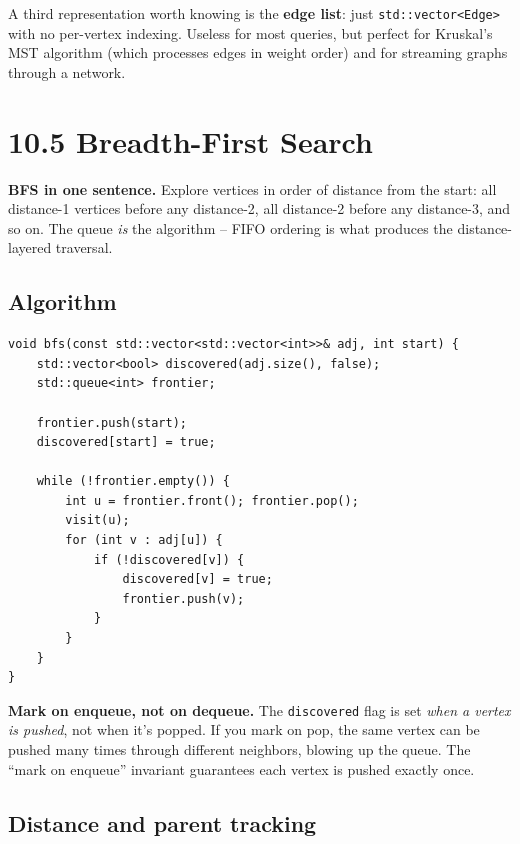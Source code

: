 \documentclass[11pt]{article}
\begin{document}
\begin{notebox}
A third representation worth knowing is the \textbf{edge list}: just \texttt{std::vector<Edge>} with no per-vertex indexing. Useless for most queries, but perfect for Kruskal's MST algorithm (which processes edges in weight order) and for streaming graphs through a network.
\end{notebox}

\section{10.5 Breadth-First Search}

\begin{ideabox}
\textbf{BFS in one sentence.} Explore vertices in order of distance from the start: all distance-1 vertices before any distance-2, all distance-2 before any distance-3, and so on. The queue \emph{is} the algorithm -- FIFO ordering is what produces the distance-layered traversal.
\end{ideabox}

\subsection*{Algorithm}

\begin{lstlisting}[basicstyle=\ttfamily\small,frame=single]
void bfs(const std::vector<std::vector<int>>& adj, int start) {
    std::vector<bool> discovered(adj.size(), false);
    std::queue<int> frontier;

    frontier.push(start);
    discovered[start] = true;

    while (!frontier.empty()) {
        int u = frontier.front(); frontier.pop();
        visit(u);
        for (int v : adj[u]) {
            if (!discovered[v]) {
                discovered[v] = true;
                frontier.push(v);
            }
        }
    }
}
\end{lstlisting}

\begin{warnbox}
\textbf{Mark on enqueue, not on dequeue.} The \texttt{discovered} flag is set \emph{when a vertex is pushed}, not when it's popped. If you mark on pop, the same vertex can be pushed many times through different neighbors, blowing up the queue. The ``mark on enqueue'' invariant guarantees each vertex is pushed exactly once.
\end{warnbox}

\subsection*{Distance and parent tracking}
\end{document}
